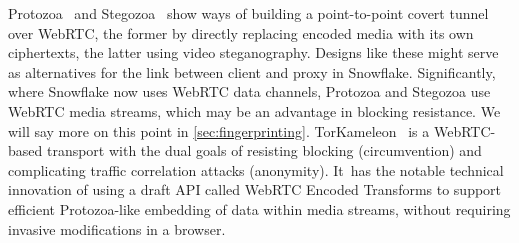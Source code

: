\documentclass[letterpaper,twocolumn]{article}
\begin{document}
Protozoa~\cite{Barradas2020a}
and Stegozoa~\cite{Figueira2022a}
show ways of building a point-to-point covert tunnel over WebRTC,
the former by directly replacing encoded media
with its own ciphertexts,
the latter using video steganography.
Designs like these might serve as alternatives
for the link between client and proxy in Snowflake.
Significantly, where Snowflake now uses WebRTC data channels,
Protozoa and Stegozoa use WebRTC media streams,
which may be an advantage in blocking resistance.
We will say more on this point in \autoref{sec:fingerprinting}.
TorKameleon~\cite{arxiv.2303.17544} is a WebRTC-based transport
with the dual goals of resisting blocking (circumvention)
and complicating traffic correlation attacks (anonymity).
It~has the notable technical innovation of using a draft API called
WebRTC Encoded Transforms
to support efficient Protozoa-like
embedding of data within media streams,
without requiring invasive modifications in a browser.

\end{document}
